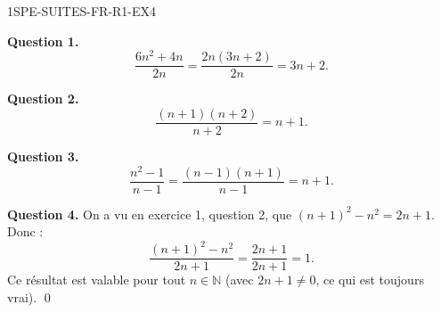 \begin{corrige}{1SPE-SUITES-FR-R1-EX4}


\textbf{Question 1.}
\[
\frac{6n^2 + 4n}{2n} = \frac{2n(3n+2)}{2n} = 3n + 2.
\]


\textbf{Question 2.}
\[
\frac{(n+1)(n+2)}{n+2} = n+1.
\]


\textbf{Question 3.}
\[
\frac{n^2-1}{n-1} = \frac{(n-1)(n+1)}{n-1} = n+1.
\]


\textbf{Question 4.} On a vu en exercice 1, question 2, que $(n+1)^2 - n^2 = 2n+1$. Donc :
\[
\frac{(n+1)^2 - n^2}{2n+1} = \frac{2n+1}{2n+1} = 1.
\]
Ce résultat est valable pour tout $n \in \mathbb{N}$ (avec $2n+1
\neq 0$, ce qui est toujours vrai). \qed

\end{corrige}
